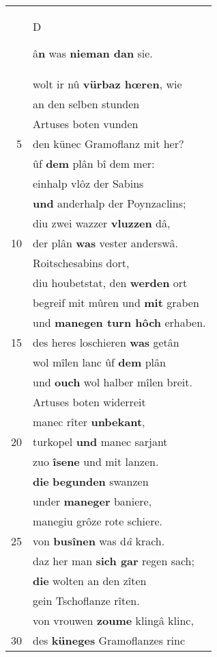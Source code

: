 \documentclass[8pt,a4paper,notitlepage]{article}
\begin{document}
\begin{table}[ht]
\begin{minipage}[t]{0.5\linewidth}
\begin{center}
\end{center}
\begin{tabular}{rl}
 & \begin{large}D\end{large}â\textbf{n} was \textbf{nieman dan} sie.\\ 
 & wolt ir nû \textbf{vürbaz hœren}, wie\\ 
 & an den selben stunden\\ 
 & Artuses boten vunden\\ 
5 & den künec Gramoflanz mit her?\\ 
 & ûf \textbf{dem} plân bî dem mer:\\ 
 & einhalp vlôz der Sabins\\ 
 & \textbf{und} anderhalp der Poynzaclins;\\ 
 & diu zwei wazzer \textbf{vluzzen} dâ,\\ 
10 & der plân \textbf{was} vester anderswâ.\\ 
 & Roitschesabins dort,\\ 
 & diu houbetstat, den \textbf{werden} ort\\ 
 & begreif mit mûren und \textbf{mit} graben\\ 
 & und \textbf{manegen turn hôch} erhaben.\\ 
15 & des heres loschieren \textbf{was} getân\\ 
 & wol mîlen lanc ûf \textbf{dem} plân\\ 
 & und \textbf{ouch} wol halber mîlen breit.\\ 
 & Artuses boten widerreit\\ 
 & manec rîter \textbf{unbekant},\\ 
20 & turkopel \textbf{und} manec sarjant\\ 
 & zuo \textbf{îsene} und mit lanzen.\\ 
 & \textbf{die} \textbf{begunden} swanzen\\ 
 & under \textbf{maneger} baniere,\\ 
 & manegiu grôze rote schiere.\\ 
25 & von \textbf{busînen} was d\textit{â} krach.\\ 
 & daz her man \textbf{sich gar} regen sach;\\ 
 & \textbf{die} wolten an den zîten\\ 
 & gein Tschoflanze rîten.\\ 
 & von vrouwen \textbf{zoume} klingâ klinc,\\ 
30 & des \textbf{küneges} Gramoflanzes rinc\\ 

\end{tabular}
\end{minipage}
\end{table}
\end{document}
